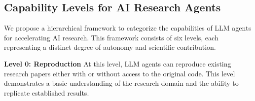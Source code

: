 \documentclass[]{fairmeta}
\newcommand{\rr}[1]{\colorbox{red}{\textcolor{white}{Roberta}}\textcolor{red}{\textbf{:#1}}}
\begin{document}



\subsection{Capability Levels for AI Research Agents}

We propose a hierarchical framework to categorize the capabilities of LLM agents for accelerating AI research.
%
This framework consists of six levels, each representing a distinct degree of autonomy and scientific contribution.

\textbf{Level 0: Reproduction}
At this level, LLM agents can reproduce existing research papers either with or without access to the original code.
%
This level demonstrates a basic understanding of the research domain and the ability to replicate established results.
%

\end{document}
